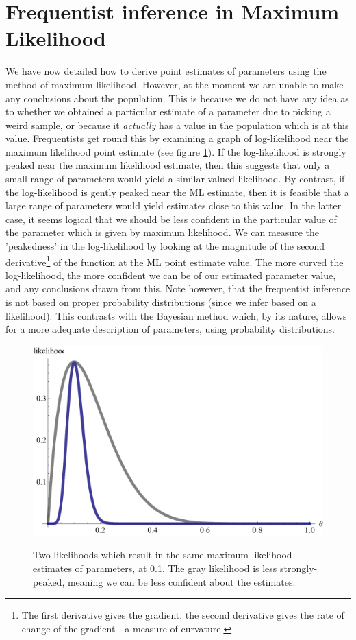 \documentclass[11pt,fullpage]{book}
\begin{document}
\section{Frequentist inference in Maximum Likelihood}
We have now detailed how to derive point estimates of parameters using the method of maximum likelihood. However, at the moment we are unable to make any conclusions about the population. This is because we do not have any idea as to whether we obtained a particular estimate of a parameter due to picking a weird sample, or because it \textit{actually} has a value in the population which is at this value. Frequentists get round this by examining a graph of log-likelihood near the maximum likelihood point estimate (see figure \ref{fig:Likelihood_likelihoodCurvature}). If the log-likelihood is strongly peaked near the maximum likelihood estimate, then this suggests that only a small range of parameters would yield a similar valued likelihood. By contrast, if the log-likelihood is gently peaked near the ML estimate, then it is feasible that a large range of parameters would yield estimates close to this value. In the latter case, it seems logical that we should be less confident in the particular value of the parameter which is given by maximum likelihood. We can measure the 'peakedness' in the log-likelihood by looking at the magnitude of the second derivative\footnote{The first derivative gives the gradient, the second derivative gives the rate of change of the gradient - a measure of curvature.} of the function at the ML point estimate value. The more curved the log-likelihood, the more confident we can be of our estimated parameter value, and any conclusions drawn from this. Note however, that the frequentist inference is not based on proper probability distributions (since we infer based on a likelihood). This contrasts with the Bayesian method which, by its nature, allows for a more adequate description of parameters, using probability distributions.

\begin{figure}
\centering
\scalebox{0.65} 
{\includegraphics{Likelihood_likelihoodCurvature.pdf}}
\caption{Two likelihoods which result in the same maximum likelihood estimates of parameters, at 0.1. The gray likelihood is less strongly-peaked, meaning we can be less confident about the estimates.}\label{fig:Likelihood_likelihoodCurvature}
\end{figure}
\end{document}
